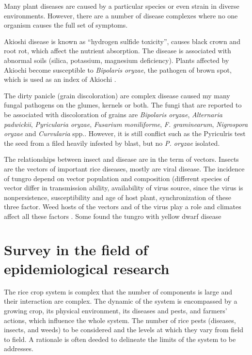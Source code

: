 Many plant diseases are caused by a particular species or even strain in diverse environments. However, there are a number of disease complexes where no one organism causes the full set of symptoms.

Akioshi disease is known as ``hydrogen sulfide toxicity'', causes black crown and root rot, which affect the nutrient absorption. The disease is associated with abnormal soils (silica, potassium, magnesium deficiency). Plants affected by Akiochi become susceptible to \textit{Bipolaris oryzae}, the pathogen of brown spot, which is used as an index of Akiochi \citep{ouricedisease}.

The dirty panicle (grain discoloration) are complex disease caused my many fungal pathogens on the glumes, kernels or both. The fungi that are reported to be associated with discoloration of grains are \textit{Bipolaris oryzae}, \textit{Alternaria padwickii}, \textit{Pyricularia oryzae}, \textit{Fusarium moniliforme}, \textit{F. graminearum}, \textit{Nigrospora oryzae} and \textit{Curvularia} spp.\cite{ouricedisease}. However, it is still conflict such as the Pyriculris test the seed from a filed heavily infested by blast, but no \textit{P. oryzae} isolated.

The relationships between insect and disease are in the term of vectors. Insects are the vectors of important rice diseases, mostly are viral disease. The incidence of tungro depend on vector population and composition (different species of vector differ in transmission ability, availability of virus source, since the virus is nonpersistence, susceptibility and age of host plant, synchronization of these three factor. Weed hosts of the vectors and of the virus play a role and climates affect all these factors \cite{naganagoud2010studies}. Some found the tungro with yellow dwarf disease \cite{ouricedisease}

\section*{Survey in the field of epidemiological research}

The rice crop system is complex that the number of components is large and their interaction are complex. The dynamic of the system is encompassed by a growing crop, its physical environment, its diseases and pests, and farmers' actions, which influence the whole system. The number of rice pests (diseases, insects, and weeds) to be considered and the levels at which they vary from field to field. A rationale is often deeded to delineate the limits of the system to be addresses.

